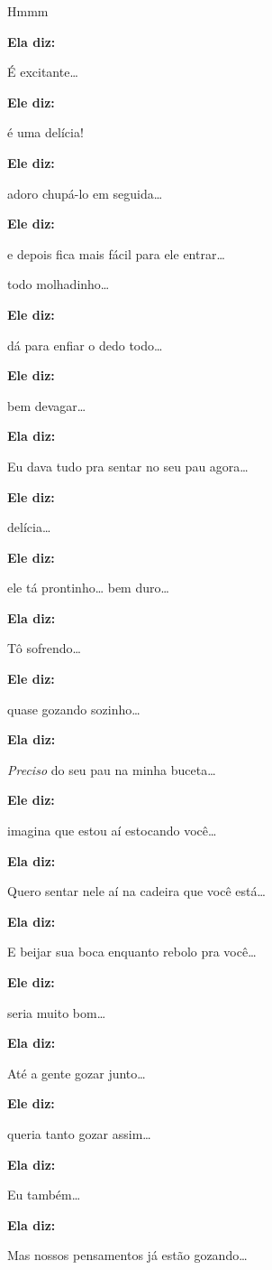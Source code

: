 Hmmm

\textbf{Ela diz:}

É excitante…

\textbf{Ele diz:}

é uma delícia!

\textbf{Ele diz:}

adoro chupá-lo em seguida…

\textbf{Ele diz:}

e depois fica mais fácil para ele entrar…

todo molhadinho…

\textbf{Ele diz:}

dá para enfiar o dedo todo…

\textbf{Ele diz:}

bem devagar…

\textbf{Ela diz:}

Eu dava tudo pra sentar no seu pau agora…

\textbf{Ele diz:}

delícia…

\textbf{Ele diz:}

ele tá prontinho… bem duro…

\textbf{Ela diz:}

Tô sofrendo…

\textbf{Ele diz:}

quase gozando sozinho…

\textbf{Ela diz:}

\emph{Preciso} do seu pau na minha buceta…

\textbf{Ele diz:}

imagina que estou aí estocando você…

\textbf{Ela diz:}

Quero sentar nele aí na cadeira que você está…

\textbf{Ela diz:}

E beijar sua boca enquanto rebolo pra você…

\textbf{Ele diz:}

seria muito bom…

\textbf{Ela diz:}

Até a gente gozar junto…

\textbf{Ele diz:}

queria tanto gozar assim…

\textbf{Ela diz:}

Eu também…

\textbf{Ela diz:}

Mas nossos pensamentos já estão gozando…

